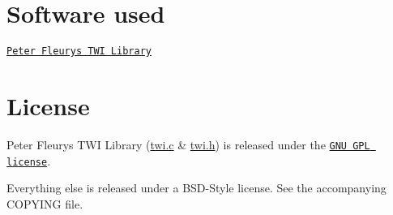 \section*{Software used}


\begin{DoxyItemize}
\item \href{http://homepage.hispeed.ch/peterfleury/avr-software.html}{\tt Peter Fleurys T\-W\-I Library}
\end{DoxyItemize}

\section*{License}

Peter Fleurys T\-W\-I Library (\hyperlink{twi_8c_source}{twi.\-c} \& \hyperlink{twi_8h}{twi.\-h}) is released under the \href{http://www.gnu.org/licenses/gpl.html}{\tt G\-N\-U G\-P\-L license}.

Everything else is released under a B\-S\-D-\/\-Style license. See the accompanying C\-O\-P\-Y\-I\-N\-G file. 